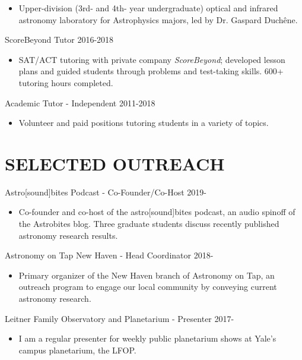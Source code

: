 \documentclass[margin]{res}
\begin{document}
\begin{resume}
\begin{itemize}
    \item Upper-division (3rd- and 4th- year undergraduate) optical and infrared astronomy laboratory for Astrophysics majors, led by Dr. Gaspard Duch\^{e}ne.
\end{itemize}
\vspace{-3mm}
ScoreBeyond Tutor \hfill 2016-2018
\begin{itemize} 
    \item SAT/ACT tutoring with private company \textit{ScoreBeyond}; developed lesson plans and guided students through problems and test-taking skills. 600+ tutoring hours completed.
\end{itemize}
\vspace{-3mm}
Academic Tutor - Independent \hfill 2011-2018
\begin{itemize}
    \item Volunteer and paid positions tutoring students in a variety of topics.
\end{itemize} 

\section{\normalfont SELECTED OUTREACH}
Astro[sound]bites Podcast - Co-Founder/Co-Host \hfill 2019-
\begin{itemize}
    \item Co-founder and co-host of the astro[sound]bites podcast, an audio spinoff of the Astrobites blog. Three graduate students discuss recently published astronomy research results.
\end{itemize}
\vspace{-3mm} 

Astronomy on Tap New Haven - Head Coordinator \hfill 2018-
\begin{itemize}
    \item Primary organizer of the New Haven branch of Astronomy on Tap, an outreach program to engage our local community by conveying current astronomy research.
\end{itemize}
\vspace{-3mm}

Leitner Family Observatory and Planetarium - Presenter \hfill 2017- 
\begin{itemize}
    \item I am a regular presenter for weekly public planetarium shows at Yale's campus planetarium, the LFOP.
\end{itemize}
\vspace{-3mm}


\end{resume}
\end{document}
